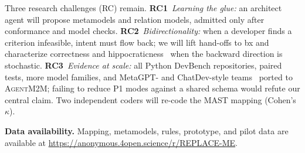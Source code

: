 \documentclass[10pt,conference]{IEEEtran}
\theoremstyle{definition}
\newcommand{\tool}{\textsc{AgentM2M}}
\newcommand{\RC}[1]{\textbf{RC#1}}
\begin{document}
Three research challenges (RC) remain. \RC{1}~\emph{Learning the glue:}
an architect agent will propose metamodels and relation models, admitted
only after conformance and model checks. \RC{2}~\emph{Bidirectionality:}
when a developer finds a criterion infeasible, intent must flow back; we
will lift hand-offs to bx and characterize
correctness and hippocraticness~\cite{stevens2010qvt} when the backward
direction is stochastic. \RC{3}~\emph{Evidence at scale:} all Python
DevBench repositories, paired tests, more model families, and MetaGPT- and ChatDev-style
teams~\cite{hong2024metagpt,qian2024chatdev} ported to \tool{}; failing to
reduce P1 modes against a shared schema would refute our central claim.
Two independent coders will re-code the MAST mapping (Cohen's $\kappa$).

\smallskip\noindent\textbf{Data availability.}\label{sec:data} Mapping, metamodels, rules,
prototype, and pilot data are available at \url{https://anonymous.4open.science/r/REPLACE-ME}.



\end{document}
